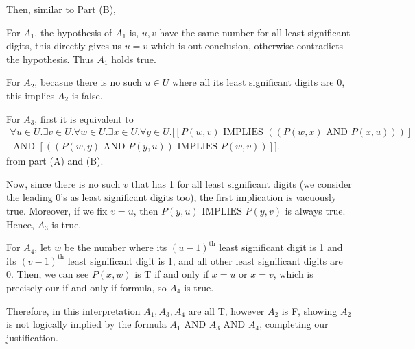 \documentclass[11pt]{article}
\newcommand{\aand}{\,\,\mathrm{AND}\,\,}
\newcommand{\iimplies}{\,\,\mathrm{IMPLIES}\,\,}
\begin{document}
\begin{enumerate}
\begin{enumerate}
Then, similar to Part (B), 

For $A_1$, the hypothesis of $A_1$ is, $u,v$ have the same number for all least significant digits, this directly gives us $u=v$ which is out conclusion, otherwise contradicts the hypothesis. Thus $A_1$ holds true.

For $A_2$, becasue there is no such $u\in U$ where all its least significant digits are 0, this implies $A_2$ is false.

For $A_3$, first it is equivalent to \begin{multline*}
    \forall u\in U. \exists v\in U. \forall w\in U. \exists x\in U. \forall y\in U. [[P(w,v)\iimplies ((P(w,x)\aand P(x,u)))]\\\aand [((P(w,y) \aand P(y,u))\iimplies P(w,v))]]. 
\end{multline*} from part (A) and (B). 

Now, since there is no such $v$ that has 1 for all least significant digits (we consider the leading 0's as least significant digits too), the first implication is vacuously true. Moreover, if we fix $v=u$, then $P(y,u)\iimplies P(y,v)$ is always true. Hence, $A_3$ is true.

For $A_4$, let $w$ be the number where its $(u-1)^{\text{th}}$ least significant digit is 1 and its $(v-1)^{\text{th}}$ least significant digit is 1, and all other least significant digits are 0. Then, we can see $P(x,w)$ is T if and only if $x=u$ or $x=v$, which is precisely our if and only if formula, so $A_4$ is true.

Therefore, in this interpretation $A_1,A_3,A_4$ are all T, however $A_2$ is F, showing $A_2$ is not logically implied by the formula $A_1\aand A_3\aand A_4$, completing our justification. 


\end{enumerate}

\end{enumerate}
\end{document}
